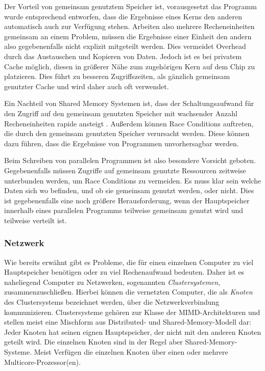 	Der Vorteil von gemeinsam genutztem Speicher ist, vorausgesetzt das Programm wurde entsprechend entworfen, dass die Ergebnisse eines Kerns den anderen automatisch auch zur Verfügung stehen. 
	Arbeiten  also mehrere Recheneinheiten gemeinsam an einem Problem, müssen die Ergebnisse einer Einheit den andern also gegebenenfalls nicht explizit mitgeteilt werden. Dies vermeidet Overhead
	durch das Austauschen und Kopieren von Daten.
	Jedoch ist es bei privatem Cache möglich, diesen in größerer Nähe zum zugehörigen Kern auf dem Chip zu platzieren. Dies führt zu besseren Zugriffszeiten, als gänzlich gemeinsam genutzter 
	Cache und wird daher auch oft verwendet. 
	
	Ein Nachteil von Shared Memory Systemen ist, dass der Schaltungsaufwand für den Zugriff auf den gemeinsam genutzten Speicher mit wachsender Anzahl Recheneinheiten rapide ansteigt
	\citep{hpcskript}. Außerdem können Race Conditions auftreten, die durch den gemeinsam genutzten Speicher verursacht werden. Diese können dazu führen, dass die Ergebnisse von Programmen
	unvorhersagbar werden.
	
	Beim Schreiben von parallelen Programmen ist also besondere Vorsicht geboten. Gegebenenfalls müssen Zugriffe auf gemeinsam genutzte Ressourcen zeitweise unterbunden werden, um Race Conditions
	zu vermeiden. Es muss klar sein welche Daten sich wo befinden, und ob sie gemeinsam genutzt werden, oder nicht. Dies ist gegebenenfalls eine noch größere Herausforderung, wenn der Hauptspeicher 
	innerhalb eines parallelen Programms teilweise gemeinsam genutzt wird und teilweise verteilt ist.
	
      \subsubsection{Netzwerk}
      \label{sec:netzwerk}
		
	Wie bereits erwähnt gibt es Probleme, die für einen einzelnen Computer zu viel Hauptspeicher benötigen oder zu viel Rechenaufwand bedeuten. Daher ist es naheliegend Computer zu Netzwerken,
	sogenannten \textit{Clustersystemen}, zusammenzuschließen. Hierbei können die vernetzten Computer, die als \textit{Knoten} des Clustersystems bezeichnet werden, über die 
	Netzwerkverbindung kommunizieren. Clustersysteme gehören zur Klasse der MIMD-Architekturen und stellen meist eine Mischform aus Distributed- und Shared-Memory-Modell dar: Jeder Knoten hat 
	seinen eignen Hauptspeicher, der nicht mit den anderen Knoten geteilt wird. Die einzelnen Knoten sind in der Regel aber Shared-Memory-Systeme. Meist Verfügen die einzelnen Knoten über
	einen oder mehrere Multicore-Prozessor(en). \citep{cluster}
	
